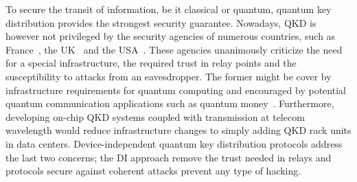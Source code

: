 To secure the transit of information, be it classical or quantum, quantum key distribution provides the strongest security guarantee.
Nowadays, QKD is however not privileged by the security agencies of numerous countries, such as France~\cite{ANSSI2020}, the UK~\cite{NCSC2020} and the USA~\cite{NSA2020}.
These agencies unanimously criticize the need for a special infrastructure, the required trust in relay points and the susceptibility to attacks from an eavesdropper.
The former might be cover by infrastructure requirements for quantum computing and encouraged by potential quantum communication applications such as quantum money~\cite{Wiesner1983,Molina2013}.
Furthermore, developing on-chip QKD systems coupled with transmission at telecom wavelength would reduce infrastructure changes to simply adding QKD rack units in data centers. 
Device-independent quantum key distribution protocols address the last two concerns; the DI approach remove the trust needed in relays and protocols secure against coherent attacks prevent any type of hacking.


